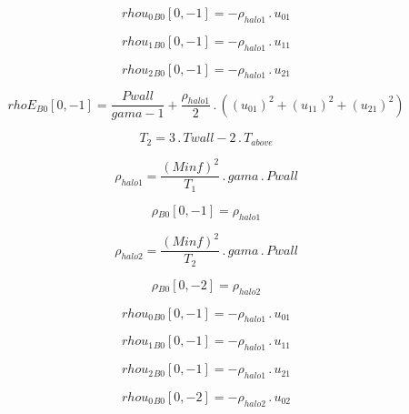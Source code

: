 \documentclass{article}
\begin{document}
\begin{dmath}{rhou_{0}{_{B0}}}[{0,-1}] = - \rho_{halo 1} \,.\, u_{01}\end{dmath}

\begin{dmath}{rhou_{1}{_{B0}}}[{0,-1}] = - \rho_{halo 1} \,.\, u_{11}\end{dmath}

\begin{dmath}{rhou_{2}{_{B0}}}[{0,-1}] = - \rho_{halo 1} \,.\, u_{21}\end{dmath}

\begin{dmath}{rhoE{_{B0}}}[{0,-1}] = \frac{Pwall}{gama - 1} + \frac{\rho_{halo 1}}{2} \,.\, \left(\left(u_{01} \right)^{2} + \left(u_{11} \right)^{2} + \left(u_{21} \right)^{2}\right)\end{dmath}

\begin{dmath}T_{2} = 3 \,.\, Twall - 2 \,.\, T_{above}\end{dmath}

\begin{dmath}\rho_{halo 1} = \frac{\left(Minf \right)^{2}}{T_{1}} \,.\, gama \,.\, Pwall\end{dmath}

\begin{dmath}{\rho{_{B0}}}[{0,-1}] = \rho_{halo 1}\end{dmath}

\begin{dmath}\rho_{halo 2} = \frac{\left(Minf \right)^{2}}{T_{2}} \,.\, gama \,.\, Pwall\end{dmath}

\begin{dmath}{\rho{_{B0}}}[{0,-2}] = \rho_{halo 2}\end{dmath}

\begin{dmath}{rhou_{0}{_{B0}}}[{0,-1}] = - \rho_{halo 1} \,.\, u_{01}\end{dmath}

\begin{dmath}{rhou_{1}{_{B0}}}[{0,-1}] = - \rho_{halo 1} \,.\, u_{11}\end{dmath}

\begin{dmath}{rhou_{2}{_{B0}}}[{0,-1}] = - \rho_{halo 1} \,.\, u_{21}\end{dmath}

\begin{dmath}{rhou_{0}{_{B0}}}[{0,-2}] = - \rho_{halo 2} \,.\, u_{02}\end{dmath}
\end{document}
